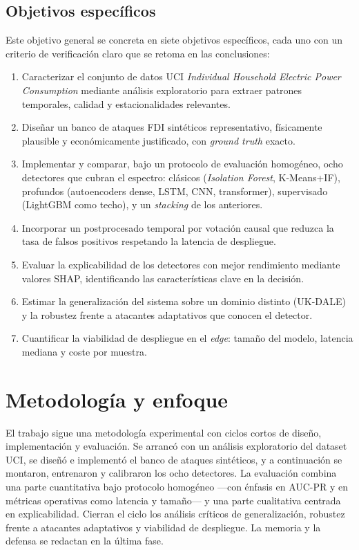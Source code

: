 \subsection*{Objetivos específicos}

Este objetivo general se concreta en siete objetivos específicos, cada uno con un criterio de verificación claro que se retoma en las conclusiones:

\begin{enumerate}[label=\textbf{OE\arabic*.},leftmargin=*,topsep=2pt]
  \item Caracterizar el conjunto de datos UCI \emph{Individual Household Electric Power Consumption} mediante análisis exploratorio para extraer patrones temporales, calidad y estacionalidades relevantes.
  \item Diseñar un banco de ataques FDI sintéticos representativo, físicamente plausible y económicamente justificado, con \textit{ground truth} exacto.
  \item Implementar y comparar, bajo un protocolo de evaluación homogéneo, ocho detectores que cubran el espectro: clásicos (\textit{Isolation Forest}, K-Means+IF), profundos (autoencoders dense, LSTM, CNN, transformer), supervisado (LightGBM como techo), y un \textit{stacking} de los anteriores.
  \item Incorporar un postprocesado temporal por votación causal que reduzca la tasa de falsos positivos respetando la latencia de despliegue.
  \item Evaluar la explicabilidad de los detectores con mejor rendimiento mediante valores SHAP, identificando las características clave en la decisión.
  \item Estimar la generalización del sistema sobre un dominio distinto (UK-DALE) y la robustez frente a atacantes adaptativos que conocen el detector.
  \item Cuantificar la viabilidad de despliegue en el \textit{edge}: tamaño del modelo, latencia mediana y coste por muestra.
\end{enumerate}

\section{Metodología y enfoque}
\label{sec:metodologia}

El trabajo sigue una metodología experimental con ciclos cortos de diseño, implementación y evaluación. Se arrancó con un análisis exploratorio del dataset UCI, se diseñó e implementó el banco de ataques sintéticos, y a continuación se montaron, entrenaron y calibraron los ocho detectores. La evaluación combina una parte cuantitativa bajo protocolo homogéneo ---con énfasis en AUC-PR y en métricas operativas como latencia y tamaño--- y una parte cualitativa centrada en explicabilidad. Cierran el ciclo los análisis críticos de generalización, robustez frente a atacantes adaptativos y viabilidad de despliegue. La memoria y la defensa se redactan en la última fase.

